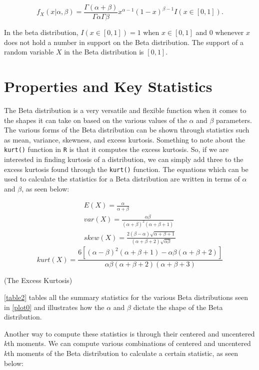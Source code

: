 \documentclass{article}\usepackage[]{graphicx}\usepackage[]{xcolor}
\begin{document}
\begin{multicols}{2}
\[f_X(x|\alpha, \beta) = \frac{\Gamma(\alpha + \beta)}{\Gamma\alpha\Gamma\beta} x^{\alpha-1}(1-x)^{\beta-1}I(x \in [0,1]).\]

\indent In the beta distribution, $I(x \in [0,1]) = 1$ when $x \in [0,1]$ and $0$ whenever $x$ does not hold a number in support on the Beta distribution. The support of a random variable $X$ in the Beta distribution is $[0,1]$.

\section{Properties and Key Statistics}
The Beta distribution is a very versatile and flexible function when it comes to the shapes it can take on based on the various values of the $\alpha$ and $\beta$ parameters. The various forms of the Beta distribution can be shown through statistics such as mean, variance, skewness, and excess kurtosis. Something to note about the \verb|kurt()| function in \texttt{R} is that it computes the excess kurtosis. So, if we are interested in finding kurtosis of a distribution, we can simply add three to the excess kurtosis found through the \verb|kurt()| function. The equations which can be used to calculate the statistics for a Beta distribution are written in terms of $\alpha$ and $\beta$, as seen below:

\begin{align*}
 E(X) = \frac{\alpha}{\alpha + \beta} \tag{The Mean}\\
var(X) = \frac{\alpha\beta}{(\alpha + \beta)^2(\alpha + \beta + 1)} \tag{The Variance} \\
skew(X) = \frac{2(\beta - \alpha)\sqrt{\alpha + \beta + 1}}{(\alpha + \beta + 2)\sqrt{\alpha\beta}} \tag{The Skewness}
\end{align*}
\[kurt(X) = \frac{6[(\alpha - \beta)^2(\alpha + \beta + 1) - \alpha\beta(\alpha + \beta + 2)]}{\alpha\beta(\alpha + \beta + 2)(\alpha + \beta + 3)}\]
\begin{flushright}
(The Excess Kurtosis)
\end{flushright}

\autoref{table2} tables all the summary statistics for the various Beta distributions seen in \autoref{plot0} and illustrates how the $\alpha$ and $\beta$ dictate the shape of the Beta distribution.

Another way to compute these statistics is through their centered and uncentered $k$th moments. We can compute various combinations of centered and uncentered $k$th moments of the Beta distribution to calculate a certain statistic, as seen below:


\end{multicols}
\end{document}
